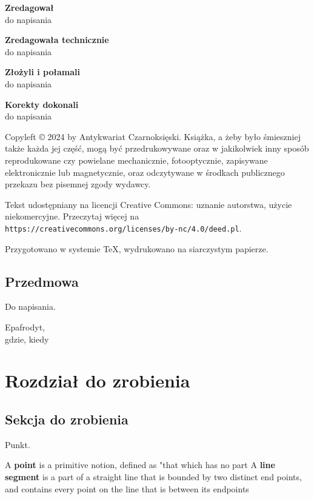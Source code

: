\documentclass{parchment}
\begin{document}
{\noindent \textbf{Zredagował}\\do napisania} \vspace{5mm}

{\noindent \textbf{Zredagowała technicznie}\\do napisania} \vspace{5mm}

{\noindent \textbf{Złożyli i połamali}\\do napisania} \vspace{5mm}

{\noindent \textbf{Korekty dokonali}\\do napisania} \vfill

{\noindent Copyleft © 2024 by Antykwariat Czarnoksięski.
Książka, a żeby było śmieszniej także każda jej część, mogą być przedrukowywane oraz w jakikolwiek inny sposób reprodukowane czy powielane mechanicznie, fotooptycznie, zapisywane elektronicznie lub magnetycznie, oraz odczytywane w środkach publicznego przekazu bez pisemnej zgody wydawcy.
}

\vspace{5mm}
{
    \noindent
    Tekst udostępniany na licencji Creative Commons: uznanie autorstwa, użycie niekomercyjne. Przeczytaj więcej na \texttt{https://creativecommons.org/licenses/by-nc/4.0/deed.pl}.
}

\vspace{5mm}

{\noindent Przygotowano w systemie \TeX, wydrukowano na siarczystym papierze.}

\newpage
\section*{Przedmowa}
Do napisania.

\begin{flushright}
Epafrodyt,\\gdzie, kiedy
\end{flushright}

\tableofcontents
\cleardoublepage %

\chapter{Rozdział do zrobienia}
\section{Sekcja do zrobienia}

Punkt.

A \textbf{point} is a primitive notion, defined as "that which has no part
A \textbf{line segment} is a part of a straight line that is bounded by two distinct end points, and contains every point on the line that is between its endpoints



\raggedright
{}
\printindex

\printindex[persons]
\end{document}
